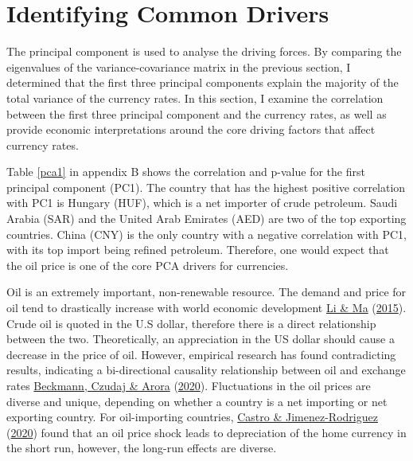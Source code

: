 \documentclass[11pt,preprint, authoryear]{elsarticle}
\numberwithin{equation}{section}
\numberwithin{figure}{section}
\numberwithin{table}{section}
\begin{document}
\hypertarget{identifying-common-drivers}{%
\section{Identifying Common Drivers}\label{identifying-common-drivers}}

The principal component is used to analyse the driving forces. By
comparing the eigenvalues of the variance-covariance matrix in the
previous section, I determined that the first three principal components
explain the majority of the total variance of the currency rates. In
this section, I examine the correlation between the first three
principal component and the currency rates, as well as provide economic
interpretations around the core driving factors that affect currency
rates.

Table \ref{pca1} in appendix B shows the correlation and p-value for the
first principal component (PC1). The country that has the highest
positive correlation with PC1 is Hungary (HUF), which is a net importer
of crude petroleum. Saudi Arabia (SAR) and the United Arab Emirates
(AED) are two of the top exporting countries. China (CNY) is the only
country with a negative correlation with PC1, with its top import being
refined petroleum. Therefore, one would expect that the oil price is one
of the core PCA drivers for currencies.

Oil is an extremely important, non-renewable resource. The demand and
price for oil tend to drastically increase with world economic
development \protect\hyperlink{ref-li2015}{Li \& Ma}
(\protect\hyperlink{ref-li2015}{2015}). Crude oil is quoted in the U.S
dollar, therefore there is a direct relationship between the two.
Theoretically, an appreciation in the US dollar should cause a decrease
in the price of oil. However, empirical research has found contradicting
results, indicating a bi-directional causality relationship between oil
and exchange rates \protect\hyperlink{ref-beck2020}{Beckmann, Czudaj \&
Arora} (\protect\hyperlink{ref-beck2020}{2020}). Fluctuations in the oil
prices are diverse and unique, depending on whether a country is a net
importing or net exporting country. For oil-importing countries,
\protect\hyperlink{ref-castro}{Castro \& Jimenez-Rodriguez}
(\protect\hyperlink{ref-castro}{2020}) found that an oil price shock
leads to depreciation of the home currency in the short run, however,
the long-run effects are diverse.
\end{document}
